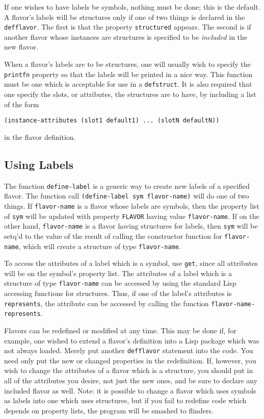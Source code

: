 If one wishes to have labels be symbols, nothing must be done; this is the
default.  A flavor's labels will be structures only if one of two things
is declared in the {\tt defflavor}.  The first is that the property
{\tt structured} appears.  The second is if another flavor whose instances are
structures is specified to be {\it included} in the new flavor.

When a flavor's labels are to be structures, one will usually wish to
specify the {\tt printfn} property so that the labels will be printed
in a nice way.  This function must be one which is acceptable for use
in a {\tt defstruct}.  It is also required that one specify the slots, or
attributes, the
structures are to have, by including a list of the form
\begin{verbatim}
(instance-attributes (slot1 default1) ... (slotN defaultN))
\end{verbatim}
in the flavor definition.

\subsection{Using Labels}

The function {\tt define-label} is a generic way to create new labels of a
specified flavor.  The function call {\tt (define-label sym flavor-name)}
will do one of two things.  If {\tt flavor-name} is a flavor  whose
labels are symbols, then the property list of {\tt sym} will be updated
with property {\tt FLAVOR} having value {\tt flavor-name}.  If on the 
other hand, {\tt flavor-name} is a flavor having structures for labels,
then {\tt sym} will be setq'd to the value of the result of calling
the constructor function for {\tt flavor-name}, which will create
a structure of type {\tt flavor-name}.

To access the attributes of a label which is a symbol,  use {\tt get},
since all attributes will be on the symbol's property list.  
The attributes of a label which is a structure of type {\tt flavor-name}
can be accessed by using the standard Lisp accessing functions for
structures.  Thus, if one of the label's attributes is {\tt represents},
the attribute can be accessed by calling the function 
{\tt flavor-name-represents}. 

Flavors can be redefined or modified at any time.  This may be done if,
for example, one wished to extend a flavor's definition into a Lisp
package which was not always loaded.  Merely put another {\tt defflavor}
statement into the code.  You need only put the new or changed 
properties in the redefinition.  If, however, you wish to change the
attributes of a flavor which is a structure, you should put in all
of the attributes you desire, not just the new ones, and be sure
to declare any included flavor as well.  Note: it is possible to
change a flavor which uses symbols as labels into one which uses
structures, but if you fail to redefine code which depends on 
property lists, the program will be smashed to flinders.


